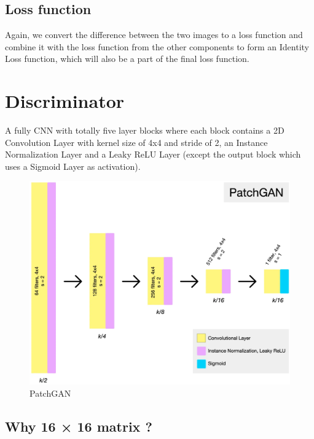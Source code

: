 \documentclass[
]{article}
\begin{document}
\hypertarget{loss-function}{%
\subsection{Loss function}\label{loss-function}}

Again, we convert the difference between the two images to a loss
function and combine it with the loss function from the other components
to form an Identity Loss function, which will also be a part of the
final loss function.

\hypertarget{discriminator}{%
\section{Discriminator}\label{discriminator}}

A fully CNN with totally five layer blocks where each block contains a
2D Convolution Layer with kernel size of 4x4 and stride of 2, an
Instance Normalization Layer and a Leaky ReLU Layer (except the output
block which uses a Sigmoid Layer as activation).

\begin{figure}
\centering
\includegraphics{./assets/PatchGAN.png}
\caption{PatchGAN}
\end{figure}

\hypertarget{why-16-uxd7-16-matrix-}{%
\subsection{Why 16 × 16 matrix ?}\label{why-16-uxd7-16-matrix-}}
\end{document}
